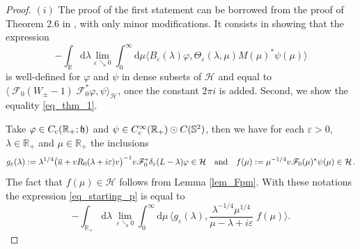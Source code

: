 \documentclass{article}
\def\d{\mathrm{d}}
\def\F{\mathscr F}
\def\H{\mathcal H}
\def\R{\mathbb R}
\def\S{\mathbb S}
\def\Hrond{\mathscr H}
\def\HS{\mathfrak h}
\begin{document}
\begin{proof}
$(i)$ The proof of the first statement can be borrowed from the proof of Theorem 2.6 in \cite{RT13}, with
only minor modifications.
It consists in showing that the expression
\begin{equation}\label{eq_starting_p}
-  \int_{\R}\d \lambda \lim_{\varepsilon\searrow 0} \int_0^\infty \d \mu 
\big\langle B_\varepsilon(\lambda)\varphi, 
 \Theta_\varepsilon(\lambda,\mu)M(\mu)^*\psi(\mu)\big\rangle
\end{equation}
is well-defined for $\varphi$ and $\psi$ in dense subsets of $\Hrond$
and equal to
$\big\langle\;\!\F_0(W_\pm-1)\;\!\F_0^*\varphi,\psi\big\rangle_{\!\Hrond}$, 
once the constant $2\pi i$ is added.
Second, we show the equality \eqref{eq_thm_1}.

Take $\varphi\in C_{\rm c}(\R_+;\HS)$ and
$\psi\in C_{\rm c}^\infty(\R_+)\odot C(\S^2)$, then we
have for each $\varepsilon>0$, $\lambda\in\R_+$ and $\mu\in\R_+$ the inclusions
$$
g_\varepsilon(\lambda):=\lambda^{1/4}\big(\overline{u} +v R_0(\lambda+i\varepsilon)v\big)^{-1}v \F_0^*\delta_\varepsilon(L-\lambda)\varphi \in \H
\quad\hbox{and}\quad
f(\mu):=\mu^{-1/4}v\F_0(\mu)^*\psi(\mu)\in\H\;\!.
$$
The fact that $f(\mu)\in\H$ follows from Lemma \ref{lem_Fpm}. With these notations the expression \eqref{eq_starting_p} is equal to
\begin{equation*}
-\int_{\R_+}\d\lambda\,\lim_{\varepsilon\searrow0}\int_0^\infty\d\mu\,
\Big\langle g_\varepsilon(\lambda),\frac{\lambda^{-1/4}\mu^{1/4}}
{\mu-\lambda+i\varepsilon}\;\!f(\mu)\Big\rangle.
\end{equation*}


\end{proof}
\end{document}
